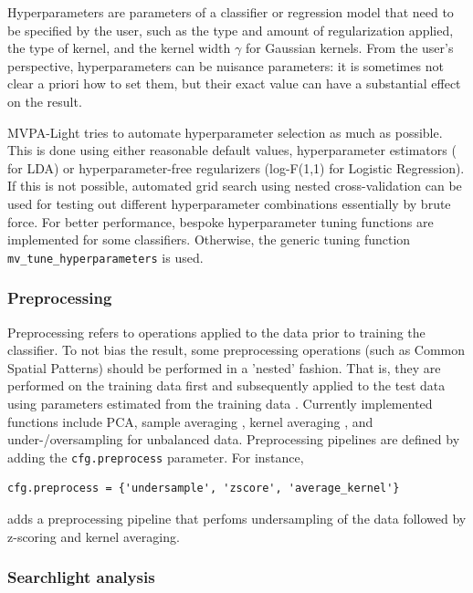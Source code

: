 \documentclass[utf8]{frontiersSCNS} %
\newcommand{\ttt}[1]{\texttt{#1}}
\begin{document}
Hyperparameters are parameters of a classifier or regression model that need to be specified by the user, such as the type and amount of regularization applied, the type of kernel, and the kernel width $\gamma$ for Gaussian kernels. From the user's perspective, hyperparameters can be nuisance parameters: it is sometimes not clear a priori how to set them, but their exact value can have a substantial effect on the result.

MVPA-Light tries to automate hyperparameter selection as much as possible. This is done using either reasonable default values, hyperparameter estimators (\cite{Ledoit2003HoneyMatrix} for LDA) or  hyperparameter-free regularizers (log-F(1,1) for Logistic Regression). If this is not possible, automated grid search using nested cross-validation can be used for testing out different hyperparameter combinations essentially by brute force. For better performance, bespoke hyperparameter tuning functions are implemented for some classifiers. Otherwise, the generic tuning function \ttt{mv\_tune\_hyperparameters} is used.

\subsubsection{Preprocessing}\label{sec:preprocessing}

Preprocessing refers to operations applied to the data prior to training the classifier. To not bias the result, some preprocessing operations (such as Common Spatial Patterns) should be performed in a 'nested' fashion. That is, they are performed on the training data first and subsequently applied to the test data using parameters estimated from the training data \citep{Lemm2011,Varoquaux2017}.
Currently implemented functions include PCA, sample averaging \citep{Cichy2017MultivariateSpace}, kernel averaging \citep{Treder2018}, and under-/oversampling for unbalanced data. Preprocessing pipelines are defined by adding the \ttt{cfg.preprocess} parameter. For instance,

\begin{verbatim}
cfg.preprocess = {'undersample', 'zscore', 'average_kernel'}
\end{verbatim}

adds a preprocessing pipeline that perfoms undersampling of the data followed by z-scoring and kernel averaging.

\subsubsection{Searchlight analysis}\label{sec:searchlight}
\end{document}
